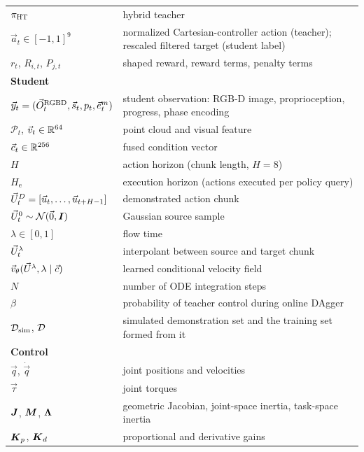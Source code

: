 \begin{center}
\begin{tabular}{lp{10.5cm}}
$\pi_{\mathrm{HT}}$ & hybrid teacher \\
$\vec{a}_t \in [-1,1]^{9}$ & normalized Cartesian-controller action (teacher); rescaled filtered target (student label) \\
$r_t$, $R_{i,t}$, $P_{j,t}$ & shaped reward, reward terms, penalty terms \\
\multicolumn{2}{l}{\textbf{Student}} \\
$\vec{y}_t = (\vec{O}^{\mathrm{RGBD}}_t, \vec{s}_t, p_t, \vec{e}^{m}_t)$ & student observation: RGB-D image, proprioception, progress, phase encoding \\
$\mathcal{P}_t$, $\vec{v}_t\in\mathbb{R}^{64}$ & point cloud and visual feature \\
$\vec{c}_t \in \mathbb{R}^{256}$ & fused condition vector \\
$H$ & action horizon (chunk length, $H=8$) \\
$H_{\mathrm{e}}$ & execution horizon (actions executed per policy query) \\
$\vec{U}^{D}_t = [\vec{u}_t,\dots,\vec{u}_{t+H-1}]$ & demonstrated action chunk \\
$\vec{U}^{0}_t \sim \mathcal{N}(\vec{0},\boldsymbol{I})$ & Gaussian source sample \\
$\lambda \in [0,1]$ & flow time \\
$\vec{U}^{\lambda}_t$ & interpolant between source and target chunk \\
$\vec{v}_{\theta}(\vec{U}^{\lambda},\lambda\mid\vec{c})$ & learned conditional velocity field \\
$N$ & number of ODE integration steps \\
$\beta$ & probability of teacher control during online DAgger \\
$\mathcal{D}_{\mathrm{sim}}$, $\mathcal{D}$ & simulated demonstration set and the training set formed from it \\
\multicolumn{2}{l}{\textbf{Control}} \\
$\vec{q}$, $\dot{\vec{q}}$ & joint positions and velocities \\
$\vec{\tau}$ & joint torques \\
$\boldsymbol{J}$, $\boldsymbol{M}$, $\boldsymbol{\Lambda}$ & geometric Jacobian, joint-space inertia, task-space inertia \\
$\boldsymbol{K}_p$, $\boldsymbol{K}_d$ & proportional and derivative gains \\
\bottomrule
\end{tabular}
\end{center}
\cleardoublepage%
